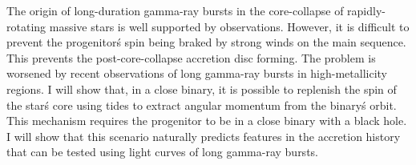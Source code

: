 


\bigskip



\bigskip

\noindent The origin of long-duration gamma-ray bursts in the core-collapse of
rapidly-rotating massive stars is well supported by observations. However, it is difficult to prevent the progenitor\'s spin being braked by strong winds on the main sequence.  This prevents the post-core-collapse accretion disc forming.  The problem is worsened by recent observations of long gamma-ray bursts in high-metallicity regions.  I will show that, in a close binary, it is possible to replenish the spin of the star\'s core using tides to extract angular momentum from the binary\'s orbit.  This mechanism requires the progenitor to be in a close binary with a black hole.  I will show that this scenario naturally predicts features in the accretion history that can be tested using light curves of long gamma-ray bursts.

